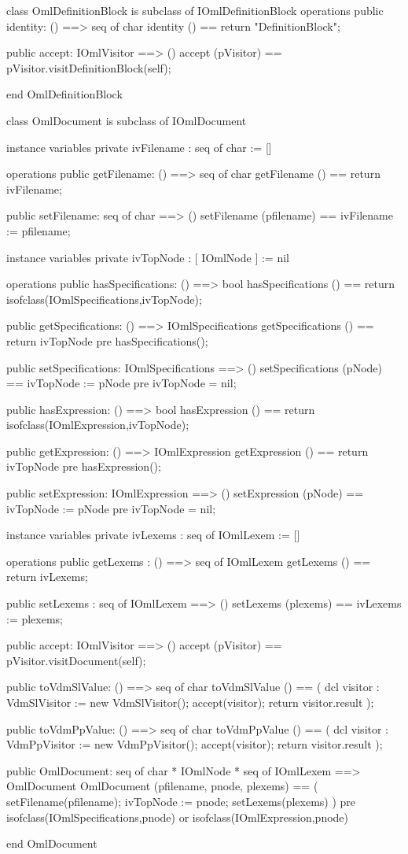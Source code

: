 \begin{vdm_al}
class OmlDefinitionBlock is subclass of IOmlDefinitionBlock
operations
  public identity: () ==> seq of char
  identity () == return "DefinitionBlock";

  public accept: IOmlVisitor ==> ()
  accept (pVisitor) == pVisitor.visitDefinitionBlock(self);

end OmlDefinitionBlock
\end{vdm_al}
\begin{vdm_al}
class OmlDocument is subclass of IOmlDocument

instance variables
  private ivFilename : seq of char := []

operations
  public getFilename: () ==> seq of char
  getFilename () == return ivFilename;

  public setFilename: seq of char ==> ()
  setFilename (pfilename) == ivFilename := pfilename;

instance variables
  private ivTopNode : [ IOmlNode ] := nil

operations
  public hasSpecifications: () ==> bool
  hasSpecifications () == return isofclass(IOmlSpecifications,ivTopNode);

  public getSpecifications: () ==> IOmlSpecifications
  getSpecifications () == return ivTopNode
    pre hasSpecifications();

  public setSpecifications: IOmlSpecifications ==> ()
  setSpecifications (pNode) == ivTopNode := pNode
    pre ivTopNode = nil;

  public hasExpression: () ==> bool
  hasExpression () == return isofclass(IOmlExpression,ivTopNode);

  public getExpression: () ==> IOmlExpression
  getExpression () == return ivTopNode
    pre hasExpression();

  public setExpression: IOmlExpression ==> ()
  setExpression (pNode) == ivTopNode := pNode
    pre ivTopNode = nil;

instance variables
  private ivLexems : seq of IOmlLexem := []

operations
  public getLexems : () ==> seq of IOmlLexem
  getLexems () == return ivLexems;

  public setLexems : seq of IOmlLexem ==> ()
  setLexems (plexems) == ivLexems := plexems;

  public accept: IOmlVisitor ==> ()
  accept (pVisitor) == pVisitor.visitDocument(self);

  public toVdmSlValue: () ==> seq of char
  toVdmSlValue () ==
    ( dcl visitor : VdmSlVisitor := new VdmSlVisitor();
      accept(visitor);
      return visitor.result );

  public toVdmPpValue: () ==> seq of char
  toVdmPpValue () ==
    ( dcl visitor : VdmPpVisitor := new VdmPpVisitor();
      accept(visitor);
      return visitor.result );

  public OmlDocument: seq of char * IOmlNode * seq of IOmlLexem ==> OmlDocument
  OmlDocument (pfilename, pnode, plexems) ==
    ( setFilename(pfilename);
      ivTopNode := pnode;
      setLexems(plexems) )
    pre isofclass(IOmlSpecifications,pnode) or isofclass(IOmlExpression,pnode)

end OmlDocument
\end{vdm_al}
